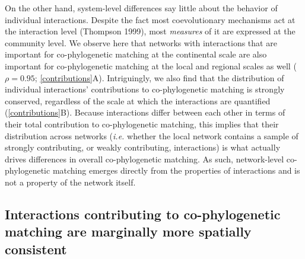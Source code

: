 \documentclass[12pt]{article}
\begin{document}
On the other hand, system-level differences say little about the
behavior of individual interactions. Despite the fact most
coevolutionary mechanisms act at the interaction level (Thompson 1999),
most \emph{measures} of it are expressed at the community level. We
observe here that networks with interactions that are important for
co-phylogenetic matching at the continental scale are also important for
co-phylogenetic matching at the local and regional scales as well
(\(\rho = 0.95\); \autoref{contributions}A). Intriguingly, we also find
that the distribution of individual interactions' contributions to
co-phylogenetic matching is strongly conserved, regardless of the scale
at which the interactions are quantified (\autoref{contributions}B).
Because interactions differ between each other in terms of their total
contribution to co-phylogenetic matching, this implies that their
distribution across networks (\emph{i.e.} whether the local network
contains a sample of strongly contributing, or weakly contributing,
interactions) is what actually drives differences in overall
co-phylogenetic matching. As such, network-level co-phylogenetic
matching emerges directly from the properties of interactions and is not
a property of the network itself.

\subsection{Interactions contributing to co-phylogenetic matching are
marginally more spatially
consistent}\label{interactions-contributing-to-co-phylogenetic-matching-are-marginally-more-spatially-consistent}
\end{document}
